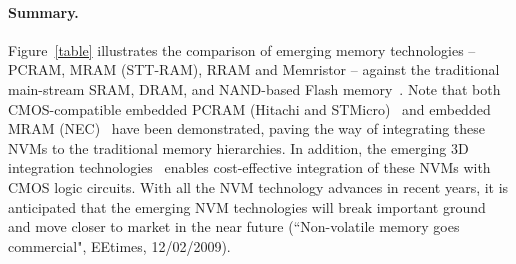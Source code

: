 \paragraph{Summary.}
Figure~\ref{table} illustrates the comparison of emerging memory technologies -- PCRAM, MRAM (STT-RAM), RRAM and Memristor -- against the traditional main-stream SRAM, DRAM, and NAND-based Flash memory~\cite{ITRS07}. Note that both CMOS-compatible embedded PCRAM (Hitachi and STMicro)~\cite{Hanzawa07,PRAM:ST2004} and embedded MRAM (NEC)~\cite{MRAM:NEC09} have been demonstrated, paving the way of integrating these NVMs to the traditional memory hierarchies. In addition, the emerging 3D integration technologies~\cite{xie:jetcs06,Xie:dac08} enables cost-effective integration of these NVMs with CMOS logic circuits. With all the NVM technology advances in recent years, it is anticipated that the emerging NVM technologies will break important ground and move closer to market in the near future (``Non-volatile memory goes commercial", EEtimes, 12/02/2009).


